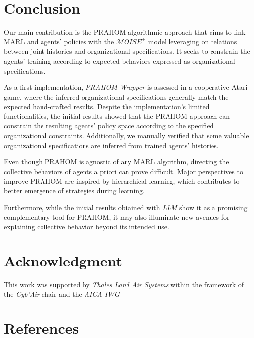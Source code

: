 \documentclass[conference]{IEEEtran}
\newcounter{relation}
\begin{document}

\section{Conclusion}

Our main contribution is the PRAHOM algorithmic approach that aims to link MARL and agents' policies with the $\mathcal{M}OISE^+$ model leveraging on relations between joint-histories and organizational specifications. It seeks to constrain the agents' training according to expected behaviors expressed as organizational specifications.

As a first implementation, \emph{PRAHOM Wrapper} is assessed in a cooperative Atari game, where the inferred organizational specifications generally match the expected hand-crafted results. Despite the implementation's limited functionalities, the initial results showed that the PRAHOM approach can constrain the resulting agents' policy space according to the specified organizational constraints. Additionally, we manually verified that some valuable organizational specifications are inferred from trained agents' histories.

Even though PRAHOM is agnostic of any MARL algorithm, directing the collective behaviors of agents a priori can prove difficult. Major perspectives to improve PRAHOM are inspired by hierarchical learning, which contributes to better emergence of strategies during learning. 

Furthermore, while the initial results obtained with \emph{LLM} show it as a promising complementary tool for PRAHOM, it may also illuminate new avenues for explaining collective behavior beyond its intended use.




\section*{Acknowledgment}

This work was supported by \emph{Thales Land Air Systems} within the framework of the \emph{Cyb'Air} chair and the \emph{AICA IWG}

\section*{References}

% 



\end{document}
